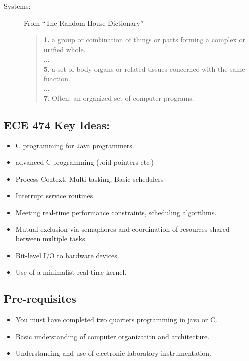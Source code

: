\begin{description}
\item[Systems:]   From ``The Random House Dictionary'' \\
{\small\tt  \begin{quote} {\bf 1. } a group or combination of things or parts forming a complex or unified
  whole.\\
  ... \\
  {\bf 5. } a set of body organs or related tissues concerned with the same function.\\
  ...\\
  {\bf 7. } Often: an organized set of computer programs.
  \end{quote}
}

\end{description}



\subsection{ECE 474 Key Ideas:}
\begin{itemize}
        \item C programming for Java programmers.
        \item advanced C programming (void pointers etc.)
        \item Process Context, Multi-tasking, Basic schedulers
        \item Interrupt service routines
        \item Meeting real-time performance constraints, scheduling algorithms.
        \item Mutual exclusion via semaphores
             and coordination of resources shared between multiple tasks.
        \item Bit-level I/O to hardware devices.
        \item Use of a minimalist real-time kernel.
\end{itemize}



\subsection{Pre-requisites}
\begin{itemize}
        \item  You must have completed two quarters programming in java or C.
        \item  Basic understanding of computer organization and architecture.
        \item  Understanding and use of electronic laboratory instrumentation.
\end{itemize}


